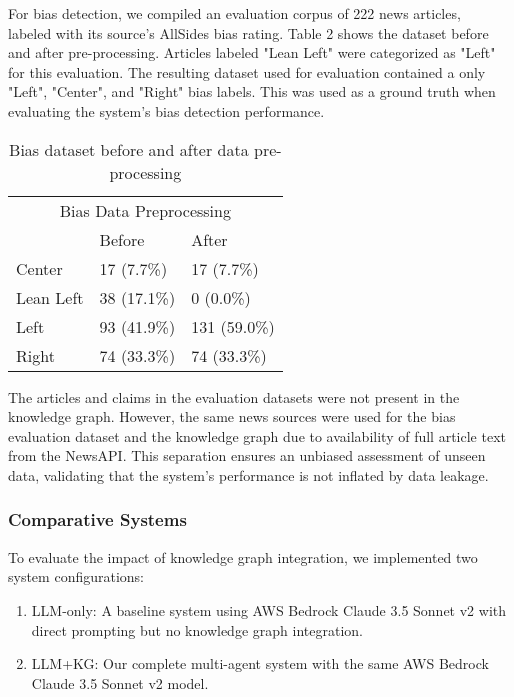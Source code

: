 \documentclass[11pt]{article}
\begin{document}
For bias detection, we compiled an evaluation corpus of 222 news articles,  labeled with its source's AllSides bias rating. Table 2 shows the dataset before and after pre-processing. Articles labeled "Lean Left" were categorized as "Left" for this evaluation. The resulting dataset used for evaluation contained a only "Left", "Center", and "Right" bias labels. This was used as a ground truth when evaluating the system's bias detection performance. 
\begin{table}[H]
\begin{center}
\begin{tabular}{lll}
\hline
\multicolumn{3}{c}{Bias Data Preprocessing} \\
            & Before        & After         \\ \hline
Center      & 17 (7.7\%)    & 17 (7.7\%)    \\
Lean Left   & 38 (17.1\%)   & 0 (0.0\%)     \\
Left        & 93 (41.9\%)   & 131 (59.0\%)  \\
Right       & 74 (33.3\%)   & 74 (33.3\%)   \\ \hline
\end{tabular}
\caption{Bias dataset before and after data pre-processing}
\label{tab:my_table}
\end{center}
\end{table}

The articles and claims in the evaluation datasets were not present in the knowledge graph. However, the same news sources were used for the bias evaluation dataset and the knowledge graph due to availability of full article text from the NewsAPI. This separation ensures an unbiased assessment of unseen data, validating that the system’s performance is not inflated by data leakage.

\subsubsection{Comparative Systems}

To evaluate the impact of knowledge graph integration, we implemented two system configurations:
\begin{enumerate}
    \item LLM-only: A baseline system using AWS Bedrock Claude 3.5 Sonnet v2 with direct prompting but no knowledge graph integration. 
    \item LLM+KG: Our complete multi-agent system with the same AWS Bedrock Claude 3.5 Sonnet v2 model.
\end{enumerate}
\end{document}
